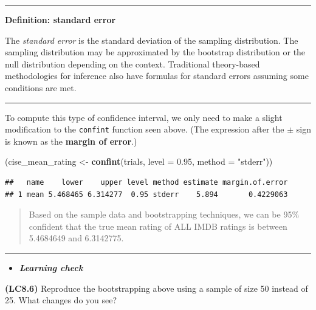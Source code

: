 \documentclass[]{tufte-book}
\newenvironment{Shaded}{\begin{snugshade}}{\end{snugshade}}
\newcommand{\KeywordTok}[1]{\textcolor[rgb]{0.13,0.29,0.53}{\textbf{{#1}}}}
\newcommand{\DataTypeTok}[1]{\textcolor[rgb]{0.13,0.29,0.53}{{#1}}}
\newcommand{\FloatTok}[1]{\textcolor[rgb]{0.00,0.00,0.81}{{#1}}}
\newcommand{\StringTok}[1]{\textcolor[rgb]{0.31,0.60,0.02}{{#1}}}
\newcommand{\NormalTok}[1]{{#1}}
\let\oldrule=\rule
\renewcommand{\rule}[1]{\oldrule{\linewidth}}
\newenvironment{rmdblock}[1]
  {\begin{shaded*}
  \begin{itemize}
  \renewcommand{\labelitemi}{
    \raisebox{-.7\height}[0pt][0pt]{
    }
  }
  \item
  }
  {
  \end{itemize}
  \end{shaded*}
  }
\newenvironment{learncheck}
  {\begin{rmdblock}{warning}}
  {\end{rmdblock}}
\begin{document}
\begin{center}\rule{0.5\linewidth}{\linethickness}\end{center}

\textbf{Definition: standard error}

The \emph{standard error} is the standard deviation of the sampling
distribution. The sampling distribution may be approximated by the
bootstrap distribution or the null distribution depending on the
context. Traditional theory-based methodologies for inference also have
formulas for standard errors assuming some conditions are met.

\begin{center}\rule{0.5\linewidth}{\linethickness}\end{center}

To compute this type of confidence interval, we only need to make a
slight modification to the \texttt{confint} function seen above. (The
expression after the \(\pm\) sign is known as the \textbf{margin of
error}.)

\begin{Shaded}
\begin{Highlighting}[]
\NormalTok{(cise_mean_rating <-}\StringTok{ }\KeywordTok{confint}\NormalTok{(trials, }\DataTypeTok{level =} \FloatTok{0.95}\NormalTok{, }\DataTypeTok{method =} \StringTok{"stderr"}\NormalTok{))}
\end{Highlighting}
\end{Shaded}

\begin{verbatim}
##   name    lower    upper level method estimate margin.of.error
## 1 mean 5.468465 6.314277  0.95 stderr    5.894       0.4229063
\end{verbatim}

\begin{quote}
Based on the sample data and bootstrapping techniques, we can be 95\%
confident that the true mean rating of ALL IMDB ratings is between
5.4684649 and 6.3142775.
\end{quote}

\begin{center}\rule{0.5\linewidth}{\linethickness}\end{center}

\begin{learncheck}
\textbf{\emph{Learning check}}
\end{learncheck}

\textbf{(LC8.6)} Reproduce the bootstrapping above using a sample of
size 50 instead of 25. What changes do you see?
\end{document}

